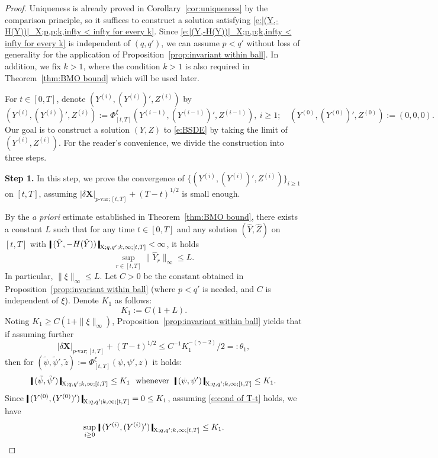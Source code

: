 \documentclass[11pt,reqno]{amsart}
\numberwithin{equation}{section}
\newcommand{\shortthickbar}{%
  \vcenter{\hbox{\rule{1.8pt}{2.2ex}}}%
}
\newcommand{\thicknm}[1]{%
  \mathopen{\shortthickbar}%
  \mkern4mu #1 \mkern4mu%
  \mathclose{\shortthickbar}%
}
\begin{document}
\begin{proof}
Uniqueness is already proved in Corollary~\ref{cor:uniqueness} by the comparison principle, so it suffices to construct a solution satisfying \eqref{e:|(Y,-H(Y))|_X;p,p;k,infty < infty for every k}. Since \eqref{e:|(Y,-H(Y))|_X;p,p;k,infty < infty for every k} is independent of $(q,q')$, we can assume  $p < q'$ without loss of generality for the application of Proposition~\ref{prop:invariant within ball}. In addition, we fix $k > 1$, where the condition $k > 1$ is also required in Theorem~\ref{thm:BMO bound} which will be used later. 

For $t \in [0,T]$, denote $(Y^{(i)},(Y^{(i)})',Z^{(i)})$ by 
\begin{equation*}
(Y^{(i)},(Y^{(i)})',Z^{(i)}) := \Phi^{\xi}_{[t,T]}(Y^{(i-1)},(Y^{(i-1)})',Z^{(i-1)}),\ i\ge 1;\quad (Y^{(0)},(Y^{(0)})',Z^{(0)}) := (0,0,0).
\end{equation*}
Our goal is  to construct a solution $(Y,Z)$ to \eqref{e:BSDE} by taking the limit of $(Y^{(i)},Z^{(i)})$.  For the reader's convenience, we divide the construction into three steps.

{\bf Step 1.} In this step, we prove the convergence of $\{(Y^{(i)},(Y^{(i)})',Z^{(i)})\}_{i \ge 1}$ on $[t,T]$, assuming $|\delta \mathbf X|_{p\text{-}\mathrm{var};[t,T]} + (T-t)^{1/2}$ is small enough. 

By the \emph{a priori} estimate established in Theorem~\ref{thm:BMO bound}, there exists a constant $L$ such that for any time $t \in [0,T]$ and any solution $(\hat Y,\hat Z)$ on $[t,T]$ with $\thicknm{(\hat Y,-H(\hat Y))}_{\mathrm X;q,q';k,\infty;[t,T]} < \infty$, it holds 
\begin{equation}\label{e:a pri esti}
\sup_{r\in[t,T]} \|\hat Y_r\|_{\infty} \le L.
\end{equation}
In particular, $\|\xi\|_{\infty} \le L$. Let $C > 0$ be the constant obtained in Proposition~\ref{prop:invariant within ball} (where $p < q'$ is needed, and $C$ is independent of $\xi$). Denote $K_1$ as follows: 
\begin{equation*}
K_1 := C (1 + L).
\end{equation*}
Noting $K_1 \ge C (1 + \|\xi\|_{\infty})$, Proposition~\ref{prop:invariant within ball} yields that if assuming further 
\begin{equation}\label{e:cond of T-t}
|\delta \mathbf X|_{p\text{-}\mathrm{var};[t,T]} + (T-t)^{1/2} \le  C^{-1} K^{-(\gamma - 2)}_1 /2  =: \theta_1,
\end{equation}
then for $(\tilde \psi,\tilde \psi',\tilde z) := \Phi^{\xi}_{[t,T]}(\psi,\psi',z)$ it holds:  
\begin{equation}\label{e:invariance of Phi}
\thicknm{(\tilde \psi, \tilde \psi')}_{\mathrm X;q,q';k,\infty;[t,T]} \le K_1\ \text{ whenever }\ \thicknm{( \psi,  \psi')}_{\mathrm X;q,q';k,\infty;[t,T]} \le K_1.
\end{equation}
Since $\thicknm{(Y^{(0)},(Y^{(0)})')}_{\mathrm X;q,q';k,\infty;[t,T]} = 0 \le K_1$, assuming \eqref{e:cond of T-t} holds, we have 
\begin{equation}\label{e:upper bound in i}
\sup_{i \ge 0} \  \thicknm{(Y^{(i)},(Y^{(i)})')}_{\mathrm X;q,q';k,\infty;[t,T]} \le K_1.
\end{equation}


\end{proof}
\end{document}
